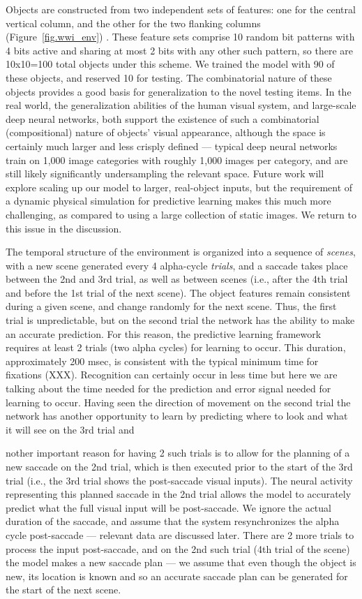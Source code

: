 \documentclass[11pt,twoside]{article}
\newif\myifpdf
\begin{document}
Objects are constructed from two independent sets of features: one for the central vertical column, and the other for the two flanking columns  (Figure~\ref{fig.wwi_env}) .  These feature sets comprise 10 random bit patterns with 4 bits active and sharing at most 2 bits with any other such pattern, so there are 10x10=100 total objects under this scheme.  We trained the model with 90 of these objects, and reserved 10 for testing.  The combinatorial nature of these objects provides a good basis for generalization to the novel testing items.  In the real world, the generalization abilities of the human visual system, and large-scale deep neural networks, both support the existence of such a combinatorial (compositional) nature of objects' visual appearance, although the space is certainly much larger and less crisply defined --- typical deep neural networks train on 1,000 image categories with roughly 1,000 images per category, and are still likely significantly undersampling the relevant space.  Future work will explore scaling up our model to larger, real-object inputs, but the requirement of a dynamic physical simulation for predictive learning makes this much more challenging, as compared to using a large collection of static images.  We return to this issue in the discussion.

The temporal structure of the environment is organized into a sequence of {\em scenes}, with a new scene generated every 4 alpha-cycle {\em trials}, and a saccade takes place between the 2nd and 3rd trial, as well as between scenes (i.e., after the 4th trial and before the 1st trial of the next scene).  The object features remain consistent during a given scene, and change randomly for the next scene.  Thus, the first trial is unpredictable, but on the second trial the network has the ability to make an accurate prediction.  For this reason, the predictive learning framework requires at least 2 trials (two alpha cycles) for learning to occur. This duration, approximately 200 msec, is consistent with the typical minimum time for fixations (XXX). Recognition can certainly occur in less time but here we are talking about the time needed for the prediction and error signal needed for learning to occur. Having seen the direction of movement on the second trial the network has another opportunity to learn by predicting where to look and what it will see on the 3rd trial and 


nother important reason for having 2 such trials is to allow for the planning of a new saccade on the 2nd trial, which is then executed prior to the start of the 3rd trial (i.e., the 3rd trial shows the post-saccade visual inputs).  The neural activity representing this planned saccade in the 2nd trial allows the model to accurately predict what the full visual input will be post-saccade.  We ignore the actual duration of the saccade, and assume that the system resynchronizes the alpha cycle post-saccade --- relevant data are discussed later.  There are 2 more trials to process the input post-saccade, and on the 2nd such trial (4th trial of the scene) the model makes a new saccade plan --- we assume that even though the object is new, its location is known and so an accurate saccade plan can be generated for the start of the next scene.
\end{document}
